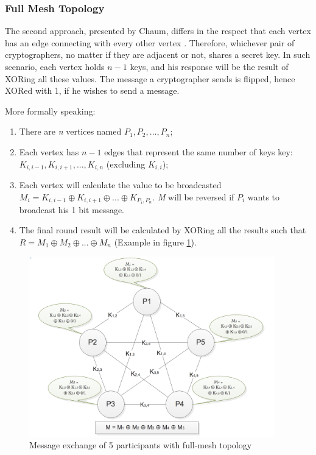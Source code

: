\subsubsection{Full Mesh Topology} \label{sec:fullmeshtopology}
The second approach, presented by Chaum, differs in the respect that each vertex has an edge connecting with every other vertex \cite{Chaum}. Therefore, whichever pair of cryptographers, no matter if they are adjacent or not, shares a secret key. In such scenario, each vertex holds \textit{$n - 1$} keys, and his response will be the result of XORing all these values. The message a cryptographer sends is flipped, hence XORed with 1, if he  wishes to send a message.

More formally speaking:
\begin{enumerate}
    \item There are \textit{n} vertices named \textit{$P_1, P_2, ..., P_n$};
    \item Each vertex has \textit{$n-1$} edges that represent the same number of keys key: \textit{$K_{i,i-1}, K_{i,i+1}, ... , K_{i,n} $} (excluding \textit{$K_{i,i}$});
    \item Each vertex will calculate the value to be broadcasted \textit{$M_i = K_{i,i-1} \oplus K_{i,i+1} \oplus ... \oplus K_{P_i,P_n} $}. \textit{M} will be reversed if \textit{$P_i$} wants to broadcast his 1 bit message.
    \item The final round result will be calculated by XORing all the results such that \textit{$R = M_1 \oplus M_2 \oplus ... \oplus M_n$} (Example in figure \ref{fig:nparticipants2}). \newline
\end{enumerate}


\begin{figure}[h!]
    \centering
    \includegraphics[width=0.95\textwidth]{Images/nparticipants2.png}
    \caption{Message exchange of 5 participants with full-mesh topology}
    \label{fig:nparticipants2}
\end{figure}


